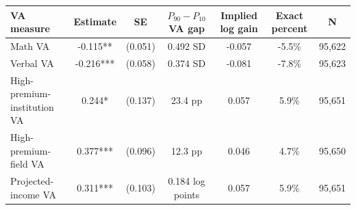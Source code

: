 \begin{tabular}{lcccccc}
\toprule
VA measure & Estimate & SE & $P_{90}-P_{10}$ VA gap & Implied log gain & Exact percent & N \\
\midrule
Math VA & -0.115** & (0.051) & 0.492 SD & -0.057 & -5.5\% & 95,622 \\
Verbal VA & -0.216*** & (0.058) & 0.374 SD & -0.081 & -7.8\% & 95,623 \\
High-premium-institution VA & 0.244* & (0.137) & 23.4 pp & 0.057 & 5.9\% & 95,651 \\
High-premium-field VA & 0.377*** & (0.096) & 12.3 pp & 0.046 & 4.7\% & 95,650 \\
Projected-income VA & 0.311*** & (0.103) & 0.184 log points & 0.057 & 5.9\% & 95,651 \\
\bottomrule
\end{tabular}
